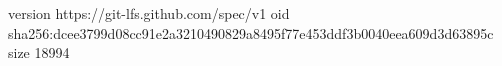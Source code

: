 version https://git-lfs.github.com/spec/v1
oid sha256:dcee3799d08cc91e2a3210490829a8495f77e453ddf3b0040eea609d3d63895c
size 18994
